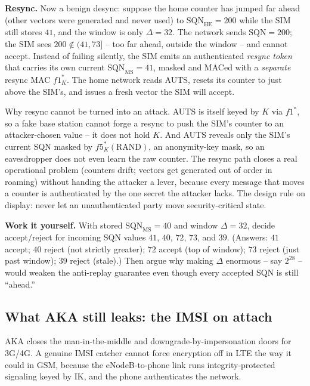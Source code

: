 \textbf{Resync.} Now a benign desync: suppose the home counter has jumped far ahead (other vectors were generated and never used) to $\text{SQN}_{\text{HE}}=200$ while the SIM still stores $41$, and the window is only $\Delta=32$. The network sends $\text{SQN}=200$; the SIM sees $200 \notin (41,73]$ -- too far ahead, outside the window -- and cannot accept. Instead of failing silently, the SIM emits an authenticated \emph{resync token}  that carries its own current $\text{SQN}_{\text{MS}}=41$, masked and MACed with a \emph{separate} resync MAC $f1^\ast_K$. The home network reads AUTS, resets its counter to just above the SIM's, and issues a fresh vector the SIM will accept.

\begin{whybox}
Why resync cannot be turned into an attack. AUTS is itself keyed by $K$ via $f1^\ast$, so a fake base station cannot forge a resync to push the SIM's counter to an attacker-chosen value -- it does not hold $K$. And AUTS reveals only the SIM's current SQN masked by $f5^\ast_K(\text{RAND})$, an anonymity-key mask, so an eavesdropper does not even learn the raw counter. The resync path closes a real operational problem (counters drift; vectors get generated out of order in roaming) without handing the attacker a lever, because every message that moves a counter is authenticated by the one secret the attacker lacks. The design rule on display: never let an unauthenticated party move security-critical state.
\end{whybox}

\begin{labbox}
\textbf{Work it yourself.} With stored $\text{SQN}_{\text{MS}}=40$ and window $\Delta=32$, decide accept/reject for incoming SQN values $41$, $40$, $72$, $73$, and $39$. (Answers: $41$ accept; $40$ reject (not strictly greater); $72$ accept (top of window); $73$ reject (just past window); $39$ reject (stale).) Then argue why making $\Delta$ enormous -- say $2^{28}$ -- would weaken the anti-replay guarantee even though every accepted SQN is still ``ahead.''
\end{labbox}

\subsection{What AKA still leaks: the IMSI on attach}
\label{ch29:aka-imsi}

AKA closes the man-in-the-middle and downgrade-by-impersonation doors for 3G/4G. A genuine IMSI catcher cannot force encryption off in LTE the way it could in GSM, because the eNodeB-to-phone link runs integrity-protected signaling keyed by IK, and the phone authenticates the network.

